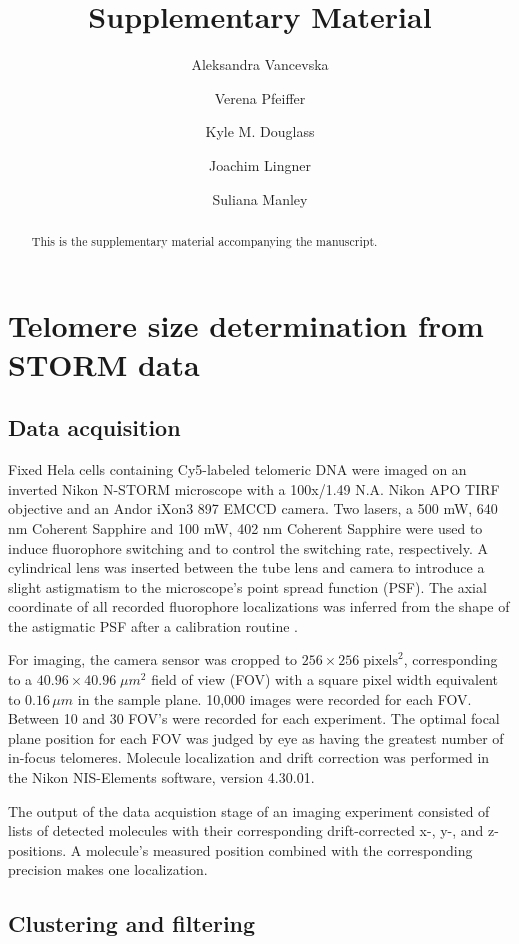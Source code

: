 \documentclass[12pt, a4paper]{article}
\author[1]{Aleksandra Vancevska}
\author[1]{Verena Pfeiffer}
\author[2]{Kyle M. Douglass}
\author[1]{Joachim Lingner}
\author[2]{Suliana Manley}
\affil[1]{Swiss Institute for Experimental Cancer Research (ISREC), EPFL, Lausanne, Switzerland}
\affil[2]{Institute of Physics of Biological Systems, EPFL, Lausanne, Switzerland}
\date{}
\title{Supplementary Material}
\begin{document}
\maketitle
\setcounter{tocdepth}{2}
\tableofcontents

\begin{abstract}
This is the supplementary material accompanying the manuscript.
\end{abstract}

\section{Telomere size determination from STORM data}
\label{sec-1}

\subsection{Data acquisition}
\label{sec-1-1}
Fixed Hela cells containing Cy5-labeled telomeric DNA were imaged
on an inverted Nikon N-STORM microscope with a 100x/1.49 N.A. Nikon
APO TIRF objective and an Andor iXon3 897 EMCCD camera. Two lasers,
a 500 mW, 640 nm Coherent Sapphire and 100 mW, 402 nm Coherent
Sapphire were used to induce fluorophore switching and to control
the switching rate, respectively. A cylindrical lens was inserted
between the tube lens and camera to introduce a slight astigmatism
to the microscope's point spread function (PSF). The axial
coordinate of all recorded fluorophore localizations was inferred
from the shape of the astigmatic PSF after a calibration routine
\cite{huang-science-2008}.

For imaging, the camera sensor was cropped to $256 \times 256 \;
   \text{pixels}^2$, corresponding to a $40.96 \times 40.96 \; \mu
   m^2$ field of view (FOV) with a square pixel width equivalent to
$0.16 \, \mu m$ in the sample plane. 10,000 images were recorded
for each FOV. Between 10 and 30 FOV's were recorded for each
experiment. The optimal focal plane position for each FOV was
judged by eye as having the greatest number of in-focus
telomeres. Molecule localization and drift correction was performed
in the Nikon NIS-Elements software, version 4.30.01.

The output of the data acquistion stage of an imaging experiment
consisted of lists of detected molecules with their corresponding
drift-corrected x-, y-, and z-positions. A molecule's measured
position combined with the corresponding precision makes one
localization.

\subsection{Clustering and filtering}
\label{sec-1-2}
\end{document}
